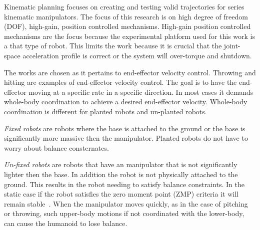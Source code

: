 Kinematic planning focuses on creating and testing valid trajectories for series kinematic manipulators.
The focus of this research is on high degree of freedom (DOF), high-gain, position controlled mechanisms.
High-gain position controlled mechanisms are the focus because the experimental platform used for this work is a that type of robot.
This limits the work because it is crucial that the joint-space acceleration profile is correct or the system will over-torque and shutdown.


The works are chosen as it pertains to end-effector velocity control.
Throwing and hitting are examples of end-effector velocity control.  
The goal is to have the end-effector moving at a specific rate in a specific direction.
In most cases it demands whole-body coordination to achieve a desired end-effector velocity.  
Whole-body coordination is different for planted robots and un-planted robots.  


\noindent \textit{Fixed robots} are robots where the base is attached to the ground or the base is significantly more massive then the manipulator.
Planted robots do not have to worry about balance consternates. 

\noindent \textit{Un-fixed robots} are robots that have an manipulator that is not significantly lighter then the base.  
In addition the robot is not physically attached to the ground.
This results in the robot needing to satisfy balance constraints.
In the static case if the robot satisfies the zero moment point (ZMP) criteria it will remain stable~\cite{5686276}.
When the manipulator moves quickly, as in the case of pitching or throwing, such upper-body motions if not coordinated with the lower-body, can cause the humanoid to lose balance.  



